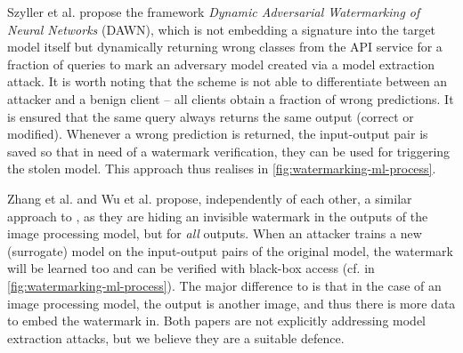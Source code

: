 Szyller et al. \cite{szyller_dawn_2020} propose the framework \textit{Dynamic Adversarial Watermarking of Neural Networks} (DAWN), which is not embedding a signature into the target model itself but dynamically returning wrong classes from the API service for a fraction of queries to mark an adversary model created via a model extraction attack.
It is worth noting that the scheme is not able to differentiate between an attacker and a benign client -- all clients obtain a fraction of wrong predictions. %
It is ensured that the same query always returns the same output (correct or modified). Whenever a wrong prediction is returned, the input-output pair is saved so that in need of a watermark verification, they can be used for triggering the stolen model. This approach thus realises  in \cref{fig:watermarking-ml-process}.

Zhang et al. \cite{zhang_model_2020} and Wu et al. \cite{wu_watermarking_2020} propose, independently of each other, a similar approach to \cite{szyller_dawn_2020}, as they are hiding an invisible watermark in the outputs of the image processing model, but for \textit{all} outputs. When an attacker trains a new (surrogate) model on the input-output pairs of the original model, the watermark will be learned too and can be verified with black-box access (cf.  in \cref{fig:watermarking-ml-process}). The major difference to \cite{szyller_dawn_2020} is that in the case of an image processing model, the output is another image, and thus there is more data to embed the watermark in. Both papers are not explicitly addressing model extraction attacks, but we believe they are a suitable defence.


